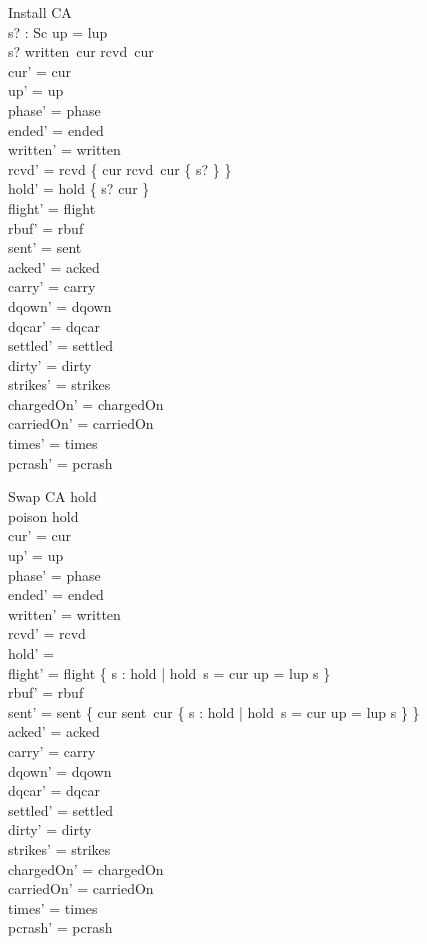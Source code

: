 \documentclass[a4paper,10pt,fleqn]{article}
\begin{document}
\begin{schema}{Install}
  \Delta CA \\
  s? : Sc
\where
  up = lup \\
  s? \in written~cur \setminus rcvd~cur \\
  cur' = cur \\
  up' = up \\
  phase' = phase \\
  ended' = ended \\
  written' = written \\
  rcvd' = rcvd \oplus \{ cur \mapsto rcvd~cur \cup \{ s? \} \} \\
  hold' = hold \oplus \{ s? \mapsto cur \} \\
  flight' = flight \\
  rbuf' = rbuf \\
  sent' = sent \\
  acked' = acked \\
  carry' = carry \\
  dqown' = dqown \\
  dqcar' = dqcar \\
  settled' = settled \\
  dirty' = dirty \\
  strikes' = strikes \\
  chargedOn' = chargedOn \\
  carriedOn' = carriedOn \\
  times' = times \\
  pcrash' = pcrash
\end{schema}

\begin{schema}{Swap}
  \Delta CA
\where
  hold \neq \emptyset \\
  poison \notin \dom hold \\
  cur' = cur \\
  up' = up \\
  phase' = phase \\
  ended' = ended \\
  written' = written \\
  rcvd' = rcvd \\
  hold' = \emptyset \\
  flight' = flight \cup \{ s : \dom hold | hold~s = cur \land up = lup \spot s \} \\
  rbuf' = rbuf \\
  sent' = sent \oplus \{ cur \mapsto sent~cur \cup \{ s : \dom hold | hold~s = cur \land up = lup \spot s \} \} \\
  acked' = acked \\
  carry' = carry \\
  dqown' = dqown \\
  dqcar' = dqcar \\
  settled' = settled \\
  dirty' = dirty \\
  strikes' = strikes \\
  chargedOn' = chargedOn \\
  carriedOn' = carriedOn \\
  times' = times \\
  pcrash' = pcrash
\end{schema}
\end{document}
